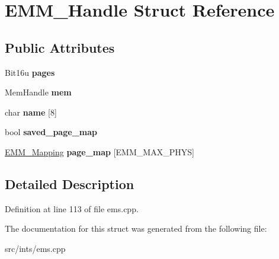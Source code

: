 \hypertarget{structEMM__Handle}{\section{E\-M\-M\-\_\-\-Handle Struct Reference}
\label{structEMM__Handle}
}
\subsection*{Public Attributes}
\begin{DoxyCompactItemize}
\item 
\hypertarget{structEMM__Handle_a8f6b6fdbb368b46a9092bf67ec268242}{Bit16u {\bfseries pages}}\label{structEMM__Handle_a8f6b6fdbb368b46a9092bf67ec268242}

\item 
\hypertarget{structEMM__Handle_ae2407285855af18647948ec831899e7b}{Mem\-Handle {\bfseries mem}}\label{structEMM__Handle_ae2407285855af18647948ec831899e7b}

\item 
\hypertarget{structEMM__Handle_a6fccb18b941ef48ded9a711b1c024103}{char {\bfseries name} \mbox{[}8\mbox{]}}\label{structEMM__Handle_a6fccb18b941ef48ded9a711b1c024103}

\item 
\hypertarget{structEMM__Handle_ae97a30d809922b3849311dc9ffe4d660}{bool {\bfseries saved\-\_\-page\-\_\-map}}\label{structEMM__Handle_ae97a30d809922b3849311dc9ffe4d660}

\item 
\hypertarget{structEMM__Handle_a1c900f12c39791084d9890233b8f10f3}{\hyperlink{structEMM__Mapping}{E\-M\-M\-\_\-\-Mapping} {\bfseries page\-\_\-map} \mbox{[}E\-M\-M\-\_\-\-M\-A\-X\-\_\-\-P\-H\-Y\-S\mbox{]}}\label{structEMM__Handle_a1c900f12c39791084d9890233b8f10f3}

\end{DoxyCompactItemize}


\subsection{Detailed Description}


Definition at line 113 of file ems.\-cpp.



The documentation for this struct was generated from the following file\-:\begin{DoxyCompactItemize}
\item 
src/ints/ems.\-cpp\end{DoxyCompactItemize}
